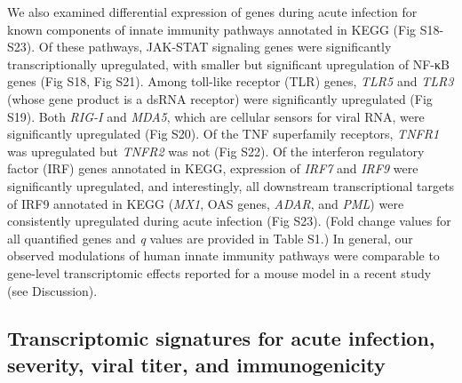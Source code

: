 We also examined differential expression of genes during acute infection for known components of innate immunity pathways annotated in KEGG\autocite{Ogata1999} (Fig S18-S23). Of these pathways, JAK-STAT signaling genes were significantly transcriptionally upregulated, with smaller but significant upregulation of NF-κB genes (Fig S18, Fig S21). Among toll-like receptor (TLR) genes, \emph{TLR5} and \emph{TLR3} (whose gene product is a dsRNA receptor) were significantly upregulated (Fig S19). Both \emph{RIG-I} and \emph{MDA5}, which are cellular sensors for viral RNA, were significantly upregulated (Fig S20). Of the TNF superfamily receptors, \emph{TNFR1} was upregulated but \emph{TNFR2} was not (Fig S22). Of the interferon regulatory factor (IRF) genes annotated in KEGG, expression of \emph{IRF7} and \emph{IRF9} were significantly upregulated, and interestingly, all downstream transcriptional targets of IRF9 annotated in KEGG (\emph{MX1}, OAS genes, \emph{ADAR}, and \emph{PML}) were consistently upregulated during acute infection (Fig S23). (Fold change values for all quantified genes and \emph{q} values are provided in Table S1.) In general, our observed modulations of human innate immunity pathways were comparable to gene-level transcriptomic effects reported for a mouse model in a recent study (see Discussion). 

\subsection{Transcriptomic signatures for acute infection, severity, viral titer, and immunogenicity}

